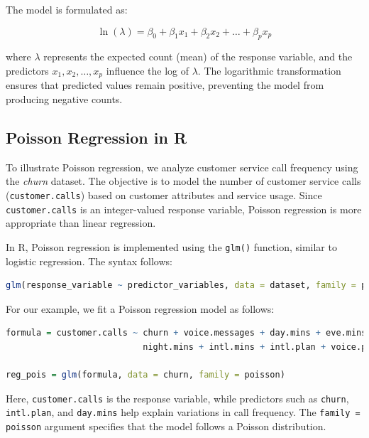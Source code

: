 \documentclass[
  11pt,
]{book}
\newcommand{\passthrough}[1]{#1}
\theoremstyle{definition}
\theoremstyle{definition}
\theoremstyle{definition}
\theoremstyle{definition}
\theoremstyle{remark}
\begin{document}
The model is formulated as:

\[
\ln(\lambda) = \beta_0 + \beta_1 x_1 + \beta_2 x_2 + \dots + \beta_p x_p
\]

where \(\lambda\) represents the expected count (mean) of the response variable, and the predictors \(x_1, x_2, \dots, x_p\) influence the log of \(\lambda\). The logarithmic transformation ensures that predicted values remain positive, preventing the model from producing negative counts.

\subsection*{Poisson Regression in R}\label{poisson-regression-in-r}


To illustrate Poisson regression, we analyze customer service call frequency using the \emph{churn} dataset. The objective is to model the number of customer service calls (\passthrough{\lstinline!customer.calls!}) based on customer attributes and service usage. Since \passthrough{\lstinline!customer.calls!} is an integer-valued response variable, Poisson regression is more appropriate than linear regression.

In R, Poisson regression is implemented using the \passthrough{\lstinline!glm()!} function, similar to logistic regression. The syntax follows:

\begin{lstlisting}[language=R]
glm(response_variable ~ predictor_variables, data = dataset, family = poisson)
\end{lstlisting}

For our example, we fit a Poisson regression model as follows:

\begin{lstlisting}[language=R]
formula = customer.calls ~ churn + voice.messages + day.mins + eve.mins + 
                           night.mins + intl.mins + intl.plan + voice.plan

reg_pois = glm(formula, data = churn, family = poisson)
\end{lstlisting}

Here, \passthrough{\lstinline!customer.calls!} is the response variable, while predictors such as \passthrough{\lstinline!churn!}, \passthrough{\lstinline!intl.plan!}, and \passthrough{\lstinline!day.mins!} help explain variations in call frequency. The \passthrough{\lstinline!family = poisson!} argument specifies that the model follows a Poisson distribution.
\end{document}
